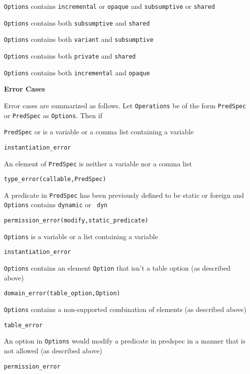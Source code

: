 \begin{description}
\item {\tt Options} contains {\tt incremental} or {\tt opaque} and {\tt subsumptive} or {\tt shared} 

\item {\tt Options} contains both {\tt subsumptive} and {\tt shared}
%
\item {\tt Options} contains both {\tt variant} and {\tt subsumptive}
%
\item {\tt Options} contains both {\tt private} and {\tt shared}
%
\item {\tt Options} contains both {\tt incremental} and {\tt opaque}
\ei

{\bf Error Cases}

Error cases are summarized as follows.  Let {\tt Operations} be of the
form {\tt PredSpec} or {\tt PredSpec} as {\tt Options}.  Then if 
%
\bi
\item {\tt PredSpec} or is a variable or a comma list containing a variable
\bi
\item {\tt instantiation\_error}
\ei
\item An element of {\tt PredSpec} is neither a variable nor a comma
  list
\bi
\item 	{\tt type\_error(callable,PredSpec)}
\ei
\item A predicate in {\tt PredSpec} has been previously defined to be
  static or foreign and {\tt Options} contains {\tt dynamic} or {\tt
    dyn}
\bi
\item 	{\tt permission\_error(modify,static\_predicate)}
\ei
\item {\tt Options} is a variable or a list containing a variable
\bi
\item {\tt instantiation\_error}
\ei
\item {\tt Options} contains an element {\tt Option} that isn't a table option (as described above)
\bi
\item {\tt domain\_error(table\_option,Option)}
\ei
\item {\tt Options} contains a non-supported combination of  elements (as described above)
\bi
\item {\tt table\_error}
\ei
\item An option in {\tt Options} would modify a predicate in predspec
  in a manner that is not allowed (as described above)
\bi
\item {\tt permission\_error}
\ei
\ei


%
%


\end{description}
